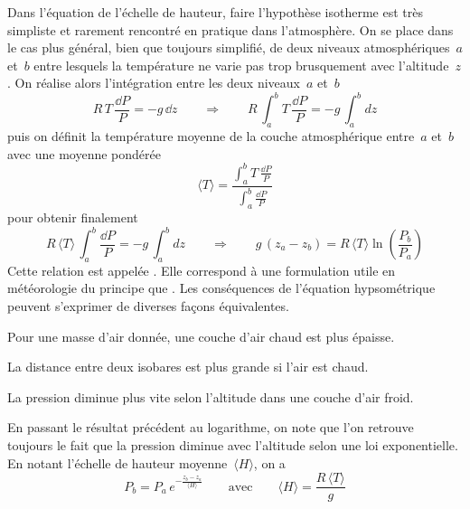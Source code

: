 \sk
Dans l'équation de l'échelle de hauteur, faire l'hypothèse isotherme est très simpliste et rarement rencontré en pratique dans l'atmosphère. On se place dans le cas plus général, bien que toujours simplifié, de deux niveaux atmosphériques~$a$ et~$b$ entre lesquels la température ne varie pas trop brusquement avec l'altitude~$z$. On réalise alors l'intégration entre les deux niveaux~$a$ et~$b$
\[R \, T \, \frac{\dd P}{P} = - g \, \dd z \qquad \Rightarrow \qquad R \, \int_a^b T\, \frac{\dd P}{P} = - g \, \int_a^b dz\]
puis on définit la température moyenne de la couche atmosphérique entre~$a$ et~$b$ avec une moyenne pondérée
\[ \langle T \rangle = \frac{\int_a^b T \, \frac{\dd P}{P}}{\int_a^b \frac{\dd P}{P}} \]
pour obtenir finalement
\[R \, \langle T \rangle \, \int_a^b \frac{\dd P}{P} = - g \, \int_a^b dz
\qquad \Rightarrow \qquad \boxed{ g \, (z_a - z_b) = R \, \langle T \rangle \ln \left( \frac{P_b}{P_a} \right) } \]
Cette relation est appelée . Elle correspond à une formulation utile en météorologie du principe que . Les conséquences de l'équation hypsométrique peuvent s'exprimer de diverses façons équivalentes.
\begin{citemize}
\item Pour une masse d'air donnée, une couche d'air chaud est plus épaisse.
\item La distance entre deux isobares est plus grande si l'air est chaud.
\item La pression diminue plus vite selon l'altitude dans une couche d'air froid.
\end{citemize}
En passant le résultat précédent au logarithme, on note que l'on retrouve toujours le fait que la pression diminue avec l'altitude selon une loi exponentielle. En notant l'échelle de hauteur moyenne~$\langle H \rangle$, on a
\[ P_b = P_a \, e^{ - \frac{z_b - z_a}{\langle H \rangle}} \qquad \text{avec} \qquad \langle H \rangle = \frac{R \, \langle T \rangle}{g} \]



